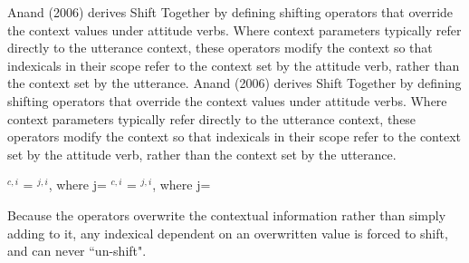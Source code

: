 \documentclass[output=paper]{langscibook}
\begin{document}
\begin{exe}
\end{exe}

Anand (2006) derives Shift Together by defining shifting operators that override the context values under attitude verbs. Where context parameters typically refer directly to the utterance context, these operators modify the context so that indexicals in their scope refer to the context set by the attitude verb, rather than the context set by the utterance.
Anand (2006) derives Shift Together by defining shifting operators that override the context values under attitude verbs. Where context parameters typically refer directly to the utterance context, these operators modify the context so that indexicals in their scope refer to the context set by the attitude verb, rather than the context set by the utterance.
\begin{exe}
	\ex\label{authshift} $^{c,i}$ = \den{$\alpha$}$^{j,i}$, where j=
	\ex {}$^{c,i}$ = \den{$\alpha$}$^{j,i}$, where j=
\end{exe}
Because the operators overwrite the contextual information rather than simply adding to it, any indexical dependent on an overwritten value is forced to shift, and can never ``un-shift".
\end{document}
